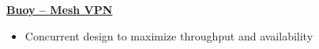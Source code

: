 \textbf{\href{https://github.com/prairir/Buoy}{Buoy -- Mesh VPN}} \par

\begin{itemize}
    \item Concurrent design to maximize throughput and availability
\end{itemize}
